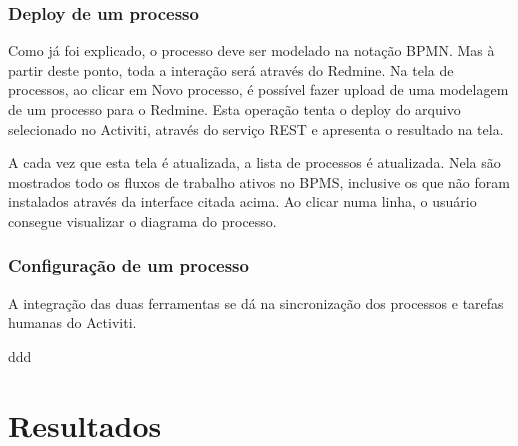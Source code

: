 \subsubsection{Deploy de um processo}\label{sec:integracao_redmine_activiti_inplementacao_funcionalidades_deploy}
Como já foi explicado, o processo deve ser modelado na notação BPMN. Mas à partir deste ponto, toda a interação será através do Redmine.
Na tela de processos, ao clicar em Novo processo, é possível fazer upload de uma modelagem de um processo para o Redmine. Esta operação tenta o deploy do arquivo selecionado no Activiti, através do serviço REST e apresenta o resultado na tela.

A cada vez que esta tela é atualizada, a lista de processos é atualizada. Nela são mostrados todo os fluxos de trabalho ativos no BPMS, inclusive os que não foram instalados através da interface citada acima. Ao clicar numa linha, o usuário consegue visualizar o diagrama do processo.

\subsubsection{Configuração de um processo}\label{sec:integracao_redmine_activiti_inplementacao_funcionalidades_configuracao}
A integração das duas ferramentas se dá na sincronização dos processos e tarefas humanas do Activiti.

\label{sec:integracao_redmine_activiti_inplementacao_funcionalidades_configuracao_processo}
ddd

\section{Resultados}\label{sec:integracao_redmine_activiti-resultados}